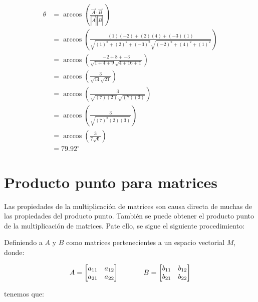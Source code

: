\documentclass{article}
\begin{document}
            \begin{equation}
                \begin{aligned}
                \theta &=\arccos \left(\frac{\vec{A} \cdot \vec{B}}{|\vec{A}||\vec{B}|}\right) \\
                &=\arccos \left(\frac{(1)(-2)+(2)(4)+(-3)(1)}{\sqrt{(1)^{2}+(2)^{2}+(-3)^{2}} \sqrt{(-2)^{2}+(4)^{2}+(1)^{2}}}\right) \\
                &=\arccos \left(\frac{-2+8+-3}{\sqrt{1+4+9} \sqrt{4+16+1}}\right) \\
                &=\arccos \left(\frac{3}{\sqrt{14} \sqrt{21}}\right) \\
                &=\arccos \left(\frac{3}{\sqrt{(7)(2)} \sqrt{(7)(3)}}\right) \\
                &=\arccos \left(\frac{3}{\sqrt{(7)^{2}(2)(3)}}\right) \\
                &=\arccos \left(\frac{3}{7 \sqrt{6}}\right) \\
                &=79.92^{\circ}
                \end{aligned}
            \end{equation}

\section{Producto punto para matrices}

    Las propiedades de la multiplicación de matrices son causa directa de muchas de las propiedades del producto punto. También se puede obtener el producto punto de la multiplicación de matrices. Pate ello, se sigue el siguiente procedimiento:

    Definiendo a $A$ y $B$ como matrices pertenecientes a un espacio vectorial $M$, donde:

    \begin{gather*}
        A = \begin{bmatrix}
           a_{11} & a_{12} \\
           a_{21} & a_{22}
        \end{bmatrix} \hspace{35 pt}
        B = \begin{bmatrix}
            b_{11} & b_{12} \\
            b_{21} & b_{22}
        \end{bmatrix}
    \end{gather*}

    tenemos que:
\end{document}
